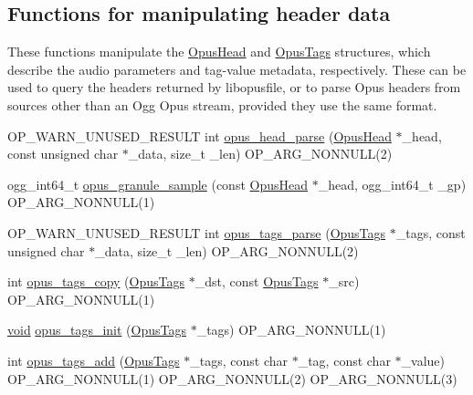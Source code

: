 \subsection*{Functions for manipulating header data}
\label{_amgrp14ef5f819e97c870c128539ed1f334e3}%
These functions manipulate the \mbox{\hyperlink{struct_opus_head}{Opus\+Head}} and \mbox{\hyperlink{struct_opus_tags}{Opus\+Tags}} structures, which describe the audio parameters and tag-\/value metadata, respectively. These can be used to query the headers returned by {\ttfamily libopusfile}, or to parse Opus headers from sources other than an Ogg Opus stream, provided they use the same format. \begin{DoxyCompactItemize}
\item 
O\+P\+\_\+\+W\+A\+R\+N\+\_\+\+U\+N\+U\+S\+E\+D\+\_\+\+R\+E\+S\+U\+LT int \mbox{\hyperlink{group__header__info_gac3259b44ac8dfac93c7adf708de96d78}{opus\+\_\+head\+\_\+parse}} (\mbox{\hyperlink{struct_opus_head}{Opus\+Head}} $\ast$\+\_\+head, const unsigned char $\ast$\+\_\+data, size\+\_\+t \+\_\+len) O\+P\+\_\+\+A\+R\+G\+\_\+\+N\+O\+N\+N\+U\+LL(2)
\item 
ogg\+\_\+int64\+\_\+t \mbox{\hyperlink{group__header__info_gaac9c6e1916fba6e53152b936055d3db0}{opus\+\_\+granule\+\_\+sample}} (const \mbox{\hyperlink{struct_opus_head}{Opus\+Head}} $\ast$\+\_\+head, ogg\+\_\+int64\+\_\+t \+\_\+gp) O\+P\+\_\+\+A\+R\+G\+\_\+\+N\+O\+N\+N\+U\+LL(1)
\item 
O\+P\+\_\+\+W\+A\+R\+N\+\_\+\+U\+N\+U\+S\+E\+D\+\_\+\+R\+E\+S\+U\+LT int \mbox{\hyperlink{group__header__info_gaed7c41a177cc7338ffec1e7ae57c59b1}{opus\+\_\+tags\+\_\+parse}} (\mbox{\hyperlink{struct_opus_tags}{Opus\+Tags}} $\ast$\+\_\+tags, const unsigned char $\ast$\+\_\+data, size\+\_\+t \+\_\+len) O\+P\+\_\+\+A\+R\+G\+\_\+\+N\+O\+N\+N\+U\+LL(2)
\item 
int \mbox{\hyperlink{group__header__info_gaceda528fa8f9f9ad1443df2eeeeaa8bf}{opus\+\_\+tags\+\_\+copy}} (\mbox{\hyperlink{struct_opus_tags}{Opus\+Tags}} $\ast$\+\_\+dst, const \mbox{\hyperlink{struct_opus_tags}{Opus\+Tags}} $\ast$\+\_\+src) O\+P\+\_\+\+A\+R\+G\+\_\+\+N\+O\+N\+N\+U\+LL(1)
\item 
\mbox{\hyperlink{_s_d_l__opengles2__gl2ext_8h_ae5d8fa23ad07c48bb609509eae494c95}{void}} \mbox{\hyperlink{group__header__info_ga35f993f5a8f11337a6503a2f43996fea}{opus\+\_\+tags\+\_\+init}} (\mbox{\hyperlink{struct_opus_tags}{Opus\+Tags}} $\ast$\+\_\+tags) O\+P\+\_\+\+A\+R\+G\+\_\+\+N\+O\+N\+N\+U\+LL(1)
\item 
int \mbox{\hyperlink{group__header__info_ga42bc0321740b618271c4cd0ae076d29a}{opus\+\_\+tags\+\_\+add}} (\mbox{\hyperlink{struct_opus_tags}{Opus\+Tags}} $\ast$\+\_\+tags, const char $\ast$\+\_\+tag, const char $\ast$\+\_\+value) O\+P\+\_\+\+A\+R\+G\+\_\+\+N\+O\+N\+N\+U\+LL(1) O\+P\+\_\+\+A\+R\+G\+\_\+\+N\+O\+N\+N\+U\+LL(2) O\+P\+\_\+\+A\+R\+G\+\_\+\+N\+O\+N\+N\+U\+LL(3)

\end{DoxyCompactItemize}
